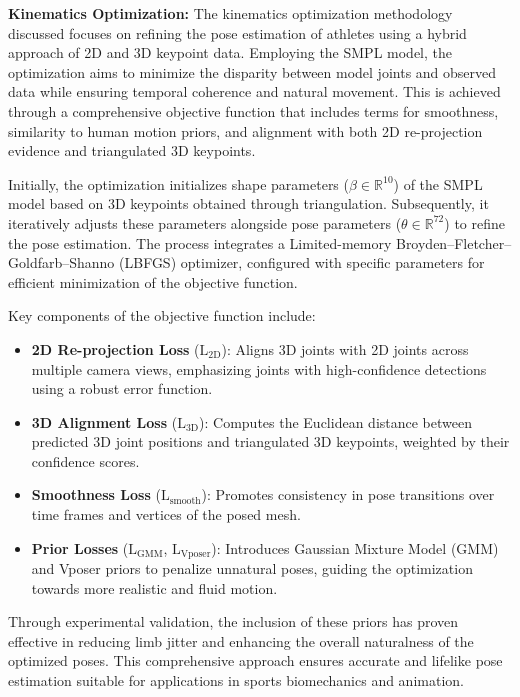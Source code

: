 \textbf{Kinematics Optimization:} The kinematics optimization methodology discussed focuses on refining the pose estimation of athletes using a hybrid approach of 2D and 3D keypoint data. Employing the SMPL model, the optimization aims to minimize the disparity between model joints and observed data while ensuring temporal coherence and natural movement. This is achieved through a comprehensive objective function that includes terms for smoothness, similarity to human motion priors, and alignment with both 2D re-projection evidence and triangulated 3D keypoints.

Initially, the optimization initializes shape parameters ($\beta \in \mathbb{R}^{10}$) of the SMPL model based on 3D keypoints obtained through triangulation. Subsequently, it iteratively adjusts these parameters alongside pose parameters ($\theta \in \mathbb{R}^{72}$) to refine the pose estimation. The process integrates a Limited-memory Broyden–Fletcher–Goldfarb–Shanno (LBFGS) optimizer, configured with specific parameters for efficient minimization of the objective function.

Key components of the objective function include:

\begin{itemize}
    \item \textbf{2D Re-projection Loss} ($\mathrm{L}_\text{2D}$): Aligns 3D joints with 2D joints across multiple camera views, emphasizing joints with high-confidence detections using a robust error function.
    \item \textbf{3D Alignment Loss} ($\mathrm{L}_\text{3D}$): Computes the Euclidean distance between predicted 3D joint positions and triangulated 3D keypoints, weighted by their confidence scores.
    \item \textbf{Smoothness Loss} ($\mathrm{L}_\text{smooth}$): Promotes consistency in pose transitions over time frames and vertices of the posed mesh.
    \item \textbf{Prior Losses} ($\mathrm{L}_{\text{GMM}}$, $\mathrm{L}_{\text{Vposer}}$): Introduces Gaussian Mixture Model (GMM) and Vposer priors to penalize unnatural poses, guiding the optimization towards more realistic and fluid motion.
\end{itemize}

Through experimental validation, the inclusion of these priors has proven effective in reducing limb jitter and enhancing the overall naturalness of the optimized poses. This comprehensive approach ensures accurate and lifelike pose estimation suitable for applications in sports biomechanics and animation.

